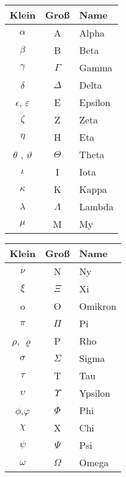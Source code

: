 \begin{minipage}{.45\textwidth}
	\centering

	\begin{tabular}{ccl}
		\toprule Klein            & Groß       & Name    \\
		\midrule $\alpha$         & \textrm{A} & Alpha   \\
		$\beta$                   & \textrm{B} & Beta    \\
		$\gamma$                  & $\Gamma$   & Gamma   \\
		$\delta$                  & $\Delta$   & Delta   \\
		$\epsilon$, $\varepsilon$ & \textrm{E} & Epsilon \\
		$\zeta$                   & \textrm{Z} & Zeta    \\
		$\eta$                    & \textrm{H} & Eta     \\
		$\theta$ , $\vartheta$    & $\Theta$   & Theta   \\
		$\iota$                   & \textrm{I} & Iota    \\
		$\kappa$                  & \textrm{K} & Kappa   \\
		$\lambda$                 & $\Lambda$  & Lambda  \\
		$\mu$                     & \textrm{M} & My      \\
		\bottomrule
	\end{tabular}
	\par
\end{minipage}
%
\hfill
%
\begin{minipage}{.45\textwidth}
	\centering
	\begin{tabular}{ccl}
		\toprule Klein    & Groß       & Name    \\
		\midrule $\nu$    & \textrm{N} & Ny      \\
		$\xi$             & $\Xi$      & Xi      \\
		\textrm{o}        & \textrm{O} & Omikron \\
		$\pi$             & $\Pi$      & Pi      \\
		$\rho$, $\varrho$ & \textrm{P} & Rho     \\
		$\sigma$          & $\Sigma$   & Sigma   \\
		$\tau$            & \textrm{T} & Tau     \\
		$\upsilon$        & $\Upsilon$ & Ypsilon \\
		$\phi$,$\varphi$  & $\Phi$     & Phi     \\
		$\chi$            & \textrm{X} & Chi     \\
		$\psi$            & $\Psi$     & Psi     \\
		$\omega$          & $\Omega$   & Omega   \\
		\bottomrule
	\end{tabular}
	\par
\end{minipage}

